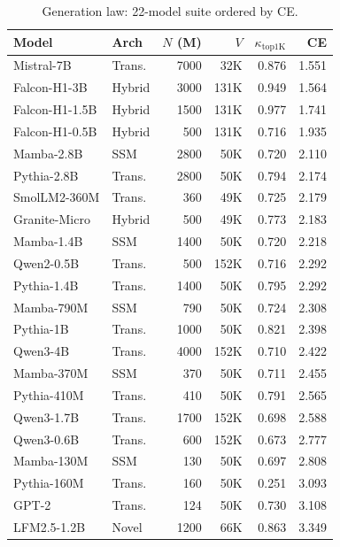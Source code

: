 \documentclass{article}
\begin{document}
\begin{table}[h]
\centering
\caption{Generation law: 22-model suite ordered by CE.}
\label{tab:generation-law-models}
\small
\begin{tabular}{llrrrr}
\toprule
Model & Arch & $N$ (M) & $V$ & $\kappa_{\mathrm{top1K}}$ & CE \\
\midrule
Mistral-7B & Trans. & 7000 & 32K & 0.876 & 1.551 \\
Falcon-H1-3B & Hybrid & 3000 & 131K & 0.949 & 1.564 \\
Falcon-H1-1.5B & Hybrid & 1500 & 131K & 0.977 & 1.741 \\
Falcon-H1-0.5B & Hybrid & 500 & 131K & 0.716 & 1.935 \\
Mamba-2.8B & SSM & 2800 & 50K & 0.720 & 2.110 \\
Pythia-2.8B & Trans. & 2800 & 50K & 0.794 & 2.174 \\
SmolLM2-360M & Trans. & 360 & 49K & 0.725 & 2.179 \\
Granite-Micro & Hybrid & 500 & 49K & 0.773 & 2.183 \\
Mamba-1.4B & SSM & 1400 & 50K & 0.720 & 2.218 \\
Qwen2-0.5B & Trans. & 500 & 152K & 0.716 & 2.292 \\
Pythia-1.4B & Trans. & 1400 & 50K & 0.795 & 2.292 \\
Mamba-790M & SSM & 790 & 50K & 0.724 & 2.308 \\
Pythia-1B & Trans. & 1000 & 50K & 0.821 & 2.398 \\
Qwen3-4B & Trans. & 4000 & 152K & 0.710 & 2.422 \\
Mamba-370M & SSM & 370 & 50K & 0.711 & 2.455 \\
Pythia-410M & Trans. & 410 & 50K & 0.791 & 2.565 \\
Qwen3-1.7B & Trans. & 1700 & 152K & 0.698 & 2.588 \\
Qwen3-0.6B & Trans. & 600 & 152K & 0.673 & 2.777 \\
Mamba-130M & SSM & 130 & 50K & 0.697 & 2.808 \\
Pythia-160M & Trans. & 160 & 50K & 0.251 & 3.093 \\
GPT-2 & Trans. & 124 & 50K & 0.730 & 3.108 \\
LFM2.5-1.2B & Novel & 1200 & 66K & 0.863 & 3.349 \\
\bottomrule
\end{tabular}
\end{table}
\end{document}
